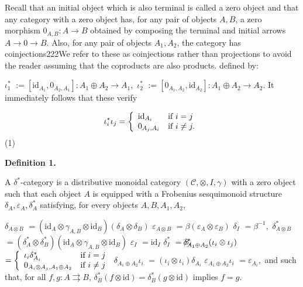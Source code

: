  
 
Recall that an initial object which is also terminal is called a zero object and that any category with a zero object has, for any pair of objects $A,B$, a zero morphism $0_{A,B}:A\to B$ obtained by composing the terminal and initial arrows $A\to 0\to B$. Also, for any pair of objects $A_{1},A_{2}$, the category has coinjections222We refer to these as coinjections rather than projections to avoid the reader assuming that the coproducts are also products. defined by:\par
    $\displaystyle\iota_{1}^{\ast}$ $\displaystyle:=[\mathrm{id}_{A_{1}},0_{A_{2},A_{1}}]:A_{1}\oplus A_{2}\to A_{1},$ $\displaystyle\iota_{2}^{\ast}$ $\displaystyle:=[0_{A_{1},A_{2}},\mathrm{id}_{A_{2}}]:A_{1}\oplus A_{2}\to A_{2}.$    
It immediately follows that these verify\par
    \[\iota^{\ast}_{i}\iota_{j}=\left\{\begin{array}[]{ll}\mathrm{id}_{A_{i}}&\text{%
if }i=j\\
0_{A_{j},A_{i}}&\text{if }i\neq j.\end{array}\right.\]  (1)   
 
 
\par\medskip\noindent\textbf{Definition 1.}\par
 
 
A $\delta^{\ast}$-category is a distributive monoidal category $(\mathcal{C},\otimes,I,\gamma)$ with a zero object such that each object $A$ is equipped with a Frobenius sesquimonoid structure $\delta_{A},\varepsilon_{A},\delta_{A}^{\ast}$ satisfying, for every objects $A,B,A_{1},A_{2}$,\par
    $\displaystyle\delta_{A\otimes B}$ $\displaystyle=(\mathrm{id}_{A}\otimes\gamma_{A,B}\otimes\mathrm{id}_{B})(%
\delta_{A}\otimes\delta_{B})$ $\displaystyle\varepsilon_{A\otimes B}$ $\displaystyle=\beta(\varepsilon_{A}\otimes\varepsilon_{B})$ $\displaystyle\delta_{I}$ $\displaystyle=\beta^{-1},$     $\displaystyle\delta^{\ast}_{A\otimes B}$ $\displaystyle=(\delta^{\ast}_{A}\otimes\delta^{\ast}_{B})(\mathrm{id}_{A}%
\otimes\gamma_{A,B}\otimes\mathrm{id}_{B})$ $\displaystyle\varepsilon_{I}$ $\displaystyle=\mathrm{id}_{I}$ $\displaystyle\delta^{\ast}_{I}$ $\displaystyle=\beta,$     $\displaystyle\hskip-15.0pt\delta^{\ast}_{A_{1}\oplus A_{2}}(\iota_{i}\otimes%
\iota_{j})$ $\displaystyle=\left\{\begin{array}[]{ll}\iota_{i}\delta^{\ast}_{A_{i}}&\text{%
if }i=j\\
0_{A_{i}\otimes A_{j},A_{1}\oplus A_{2}}&\text{if }i\neq j\end{array}\right.$ $\displaystyle\delta_{A_{1}\oplus A_{2}}\iota_{i}$ $\displaystyle=(\iota_{i}\otimes\iota_{i})\delta_{A_{i}}$ $\displaystyle\varepsilon_{A_{1}\oplus A_{2}}\iota_{i}$ $\displaystyle=\varepsilon_{A_{i}},$    
and such that, for all $f,g:A\rightrightarrows B$, $\delta^{\ast}_{B}(f\otimes\mathrm{id})=\delta^{\ast}_{B}(g\otimes\mathrm{id})$ implies $f=g$.\par
 
